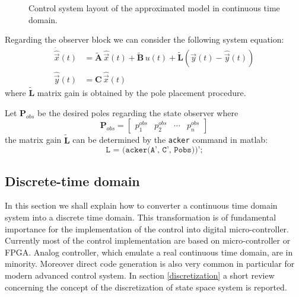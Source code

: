 \documentclass[12pt,a4paper,oneside]{book}
\begin{document}
\begin{onehalfspace}
\begin{figure}[H]
	\captionsetup{width=0.75\textwidth}		
	\caption{Control system layout of the approximated model in continuous time domain.}
	\label{control_layout_2}
\end{figure}
Regarding the observer block we can consider the following system equation:
\begin{equation}
	\begin{aligned}
		\dot{\hat{\vec{x}}}(t)  &= \tilde{\mathbf{A}} \,\hat{\vec{x}}(t) +\tilde{\mathbf{B}} \,u(t)+\tilde{\mathbf{L}} \left( \vec{y}(t) - \hat{\vec{y}}(t) \right)  \\[6pt]
		\hat{\vec{y}}(t)  &= \mathbf{C} \,\hat{\vec{x}}(t)
	\end{aligned}
\end{equation}
where $\tilde{\mathbf{L}}$ matrix gain is obtained by the pole placement procedure. 

Let $\mathbf{P}_{obs}$ be the desired poles regarding the state observer where
\begin{equation*}
	\mathbf{P}_{obs}=\begin{bmatrix}p_1^{obs} & p_2^{obs} & \cdots & p_n^{obs}\end{bmatrix}
\end{equation*}
the matrix gain $\tilde{\mathbf{L}}$ can be determined by the \texttt{acker} command in matlab: 
$$\texttt{L = (acker(A', C', Pobs))';}$$



\subsection{Discrete-time domain}
In this section we shall explain how to converter a continuous time domain system into a discrete time domain. This transformation is of fundamental importance for the implementation of the control into digital micro-controller. Currently most of the control implementation are based on micro-controller or FPGA. Analog controller, which emulate a real continuous time domain, are in minority. Moreover direct code generation is also very common in particular for modern advanced control system. In section \ref{discretization} a short review concerning the concept of the discretization of state space system is reported.


\end{onehalfspace}
\end{document}
